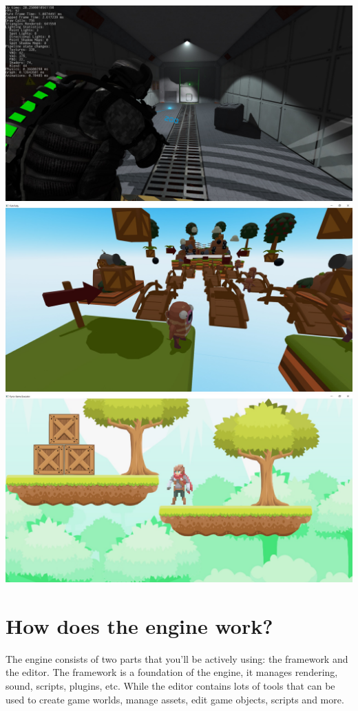 \documentclass[
]{book}
\theoremstyle{definition}
\theoremstyle{definition}
\theoremstyle{definition}
\theoremstyle{definition}
\theoremstyle{remark}
\begin{document}
\includegraphics{images/game_example1.jpg}
\includegraphics{images/game_example2.jpg}
\includegraphics{images/game_example3.jpg}

\section{How does the engine work?}\label{how-does-the-engine-work}

The engine consists of two parts that you'll be actively using: the framework and the editor. The framework is a foundation of the engine, it manages rendering, sound, scripts, plugins, etc. While the editor contains lots of tools that can be used to create game worlds, manage assets, edit game objects, scripts and more.
\end{document}
